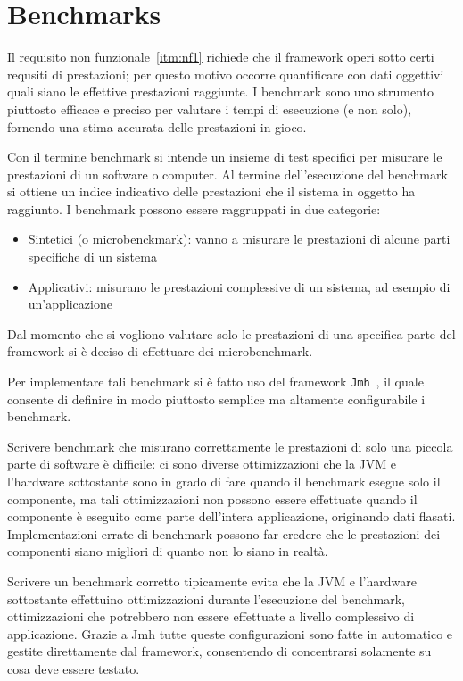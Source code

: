 \section{Benchmarks}\label{sec:benchmarks}
Il requisito non funzionale~\ref{itm:nf1} richiede che il framework operi sotto certi requsiti di prestazioni;
per questo motivo occorre quantificare con dati oggettivi quali siano le effettive prestazioni raggiunte.
I benchmark sono uno strumento piuttosto efficace e preciso per valutare i tempi di esecuzione (e non solo), fornendo
una stima accurata delle prestazioni in gioco.

Con il termine benchmark si intende un insieme di test specifici per misurare le prestazioni di un software o computer.
Al termine dell'esecuzione del benchmark si ottiene un indice indicativo delle prestazioni che il sistema in oggetto ha
raggiunto.
I benchmark possono essere raggruppati in due categorie:
\begin{itemize}
    \item Sintetici (o microbenckmark): vanno a misurare le prestazioni di alcune parti specifiche di un sistema
    \item Applicativi: misurano le prestazioni complessive di un sistema, ad esempio di un'applicazione
\end{itemize}

Dal momento che si vogliono valutare solo le prestazioni di una specifica parte del framework si è deciso di effettuare
dei microbenchmark.

Per implementare tali benchmark si è fatto uso del framework \texttt{Jmh}~\cite{jmh}, il quale consente di definire in
modo piuttosto semplice ma altamente configurabile i benchmark.

Scrivere benchmark che misurano correttamente le prestazioni di solo una piccola parte di software è difficile: ci sono
diverse ottimizzazioni che la JVM e l'hardware sottostante sono in grado di fare quando il benchmark esegue solo il
componente, ma tali ottimizzazioni non possono essere effettuate quando il componente è eseguito come parte dell'intera
applicazione, originando dati flasati.
Implementazioni errate di benchmark possono far credere che le prestazioni dei componenti siano migliori di quanto non
lo siano in realtà.

Scrivere un benchmark corretto tipicamente evita che la JVM e l'hardware sottostante effettuino ottimizzazioni
durante l'esecuzione del benchmark, ottimizzazioni che potrebbero non essere effettuate a livello complessivo di
applicazione.
Grazie a Jmh tutte queste configurazioni sono fatte in automatico e gestite direttamente dal framework, consentendo di
concentrarsi solamente su cosa deve essere testato.

